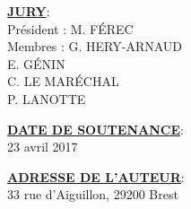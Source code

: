 \documentclass[12pt,a4paper]{article}
\begin{document}
\begin{minipage}[t][5cm]{15cm}
\textbf{\underline{JURY}}: \\
 Président : M. FÉREC \\
 Membres  :  G. HERY-ARNAUD \\
 \hspace*{1.9cm} E. GÉNIN\\
 \hspace*{1.9cm} C. LE MARÉCHAL\\
 \hspace*{1.9cm} P. LANOTTE\\

 \end{minipage}



\begin{minipage}[t][2cm]{15cm}
\textbf{\underline{DATE DE SOUTENANCE}}: \\
 23 avril 2017
 \end{minipage}



\begin{minipage}[t][3cm]{15cm}
\textbf{\underline{ADRESSE DE L'AUTEUR}}: \\
33 rue d'Aiguillon, 29200 Brest
\end{minipage}
\end{document}
